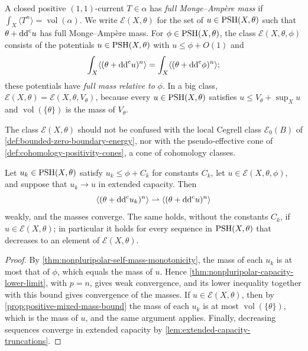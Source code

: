 \begin{definition}\label{def:full-nonpluripolar-mass}
A closed positive $(1,1)$-current $T\in\alpha$ has \emph{full Monge--Amp\`ere mass} if $\int_X\langle T^n\rangle=\operatorname{vol}(\alpha)$. We write $\mathcal E(X,\theta)$ for the set of $u\in\mathrm{PSH}(X,\theta)$ such that $\theta+\mathrm{dd}^{\mathrm{c}} u$ has full Monge--Amp\`ere mass. For $\phi\in\mathrm{PSH}(X,\theta)$, the class $\mathcal E(X,\theta,\phi)$ consists of the potentials $u\in\mathrm{PSH}(X,\theta)$ with $u\leq\phi+O(1)$ and
\[
 \int_X\langle(\theta+\mathrm{dd}^{\mathrm{c}} u)^n\rangle
     =\int_X\langle(\theta+\mathrm{dd}^{\mathrm{c}}\phi)^n\rangle;
\]
these potentials have \emph{full mass relative to} $\phi$. In a big class, $\mathcal E(X,\theta)=\mathcal E(X,\theta,V_\theta)$, because every $u\in\mathrm{PSH}(X,\theta)$ satisfies $u\leq V_\theta+\sup_Xu$ and $\operatorname{vol}(\{\theta\})$ is the mass of $V_\theta$.
\end{definition}
The class $\mathcal E(X,\theta)$ should not be confused with the local Cegrell class $\mathcal E_0(B)$ of \cref{def:bounded-zero-boundary-energy}, nor with the pseudo-effective cone of \cref{def:cohomology-positivity-cones}, a cone of cohomology classes.

\begin{corollary}\label{cor:relative-full-mass-capacity-convergence}
Let $u_k\in\mathrm{PSH}(X,\theta)$ satisfy $u_k\leq\phi+C_k$ for constants $C_k$, let $u\in\mathcal E(X,\theta,\phi)$, and suppose that $u_k\to u$ in extended capacity. Then
\[
 \langle(\theta+\mathrm{dd}^{\mathrm{c}} u_k)^n\rangle
                   \rightharpoonup\langle(\theta+\mathrm{dd}^{\mathrm{c}} u)^n\rangle
\]
weakly, and the masses converge. The same holds, without the constants $C_k$, if $u\in\mathcal E(X,\theta)$; in particular it holds for every sequence in $\mathrm{PSH}(X,\theta)$ that decreases to an element of $\mathcal E(X,\theta)$.
\end{corollary}
\begin{proof}
By \cref{thm:nonpluripolar-self-mass-monotonicity}, the mass of each $u_k$ is at most that of $\phi$, which equals the mass of $u$. Hence \cref{thm:nonpluripolar-capacity-lower-limit}, with $p=n$, gives weak convergence, and its lower inequality together with this bound gives convergence of the masses. If $u\in\mathcal E(X,\theta)$, then by \cref{prop:positive-mixed-mass-bound} the mass of each $u_k$ is at most $\operatorname{vol}(\{\theta\})$, which is the mass of $u$, and the same argument applies. Finally, decreasing sequences converge in extended capacity by \cref{lem:extended-capacity-truncations}.
\end{proof}

